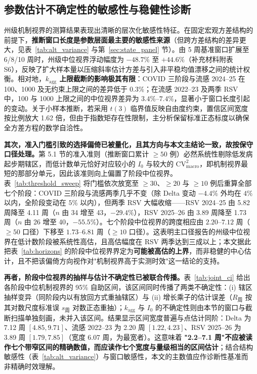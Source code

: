 \documentclass[11pt,a4paper]{article}
\theoremstyle{plain}
\theoremstyle{definition}
\begin{document}
\subsection{参数估计不确定性的敏感性与稳健性诊断}\label{sec:sensitivity}

州级机制视界的测算结果表现出清晰的层次化敏感性特征。在固定宏观方差结构的前提下，\textbf{推断窗口长度是参数层面最主要的敏感性来源}（但跨方差结构的差异更大，见表~\ref{tab:alt_variance} 与第~\ref{sec:state_panel} 节）。由 5 周基准窗口扩展至 6/8/10 周时，州级中位视界浮动幅度为 $-48.7\%$ 至 $+44.6\%$（补充材料附表 S6），反映了扩大样本量以压缩斜率估计方差与引入非平稳均值漂移之间的统计权衡。相对地，\textbf{$k_{\text{agg}}$ 上限截断的影响极其有限}：COVID 三阶段与流感 2024--25 在 100、1000 及无约束上限之间的差异低于 $0.3\%$；在流感 2022--23 及两季 RSV 中，100 与 1000 上限之间的中位视界差异为 $3.4\%\text{--}7.4\%$，显著小于窗口长度引起的变动。关于小样本推断，若采用 $t(3)$ 临界值反映自由度约束，置信区间宽度按比例放大 1.62 倍，但由于指数矩存在性限制，主分析保留标准正态标度以确保全方差方程的数学自洽性。

\textbf{其次，准入门槛引致的选择偏倚已被量化，且其方向与本文主结论一致，故按保守口径处理。}第 5.1 节的准入准则（推断窗口累计 $\ge 50$ 例）必然系统性剔除低发病起步期辖区，而低计数单元恰好对应较小的 $I_0$ 与较大的 $\text{CV}^2_{\text{macro}}$，即机制视界最短的那部分单元，因此该准则向上偏置了阶段中位视界。表~\ref{tab:threshold_sweep} 将门槛依次放宽至 $\ge 30$、$\ge 20$ 与 $\ge 10$ 例后重算全部七个阶段：COVID 三阶段与流感两季几乎不变（除 Delta 变动 $-4.4\%$ 外均在 $4\%$ 以内，全阶段变动在 $5\%$ 以内），但两季 RSV 大幅收缩——RSV 2024--25 由 5.82 周降至 4.11 周（$n$ 由 34 增至 43，$-29.4\%$），RSV 2025--26 由 3.89 周降至 1.73 周（$n$ 由 26 增至 40，$-55.5\%$）。七个阶段中位视界的跨度相应由 $2.20\text{--}7.12$ 周（$\ge 50$ 口径）下移至 $1.73\text{--}6.81$ 周（$\ge 10$ 口径）。这表明主口径报告的州级中位视界在低计数阶段被系统性高估，且高估幅度在 RSV 两季达到三成以上；本文据此把表~\ref{tab:horizons} 的阶段中位视界界定为\textbf{可能被高估的上界}，而非稳健的中心估计，且不把该偏倚方向视作对"机制视界高于实测时效"这一结论的支持。

\begin{table}[htbp]
\centering
\footnotesize
\caption{准入门槛放宽后各阶段州级中位机制视界（周）与参与辖区数，括号内为 $n$}
\label{tab:threshold_sweep}

\end{table}

\textbf{再者，阶段中位视界的抽样与估计不确定性已被联合传播。}表~\ref{tab:joint_ci} 给出各阶段中位机制视界的 95\% 自助区间，该区间同时传播了两类不确定性：(i) 辖区抽样变异（同阶段内以有放回方式重抽辖区）与 (ii) 增长乘子的估计误差（$R_{\text{周}}$ 按其对数尺度标准误 $s_{\text{周}}$ 对数正态重抽）；$k_{\text{agg}}$ 与 $I_0$ 的不确定性则由本节的窗口与截断扫描单独刻画，未并入该区间。结果显示区间宽度普遍与点估计同阶：Delta 为 7.12 周 $[4.85, 9.71]$、流感 2022--23 为 2.20 周 $[1.22, 4.23]$、RSV 2025--26 为 3.89 周 $[1.79, 7.85]$（宽度 6.07 周，为最宽者）。这意味着 \textbf{"2.2--7.1 周"不应被读作七个带窄区间的精确数值，而应读作七个宽度与量级相当的区间估计}；结合结构敏感性（表~\ref{tab:alt_variance}）与窗口敏感性，本文的主数值应作诊断性基准而非精确时效理解。
\end{document}
